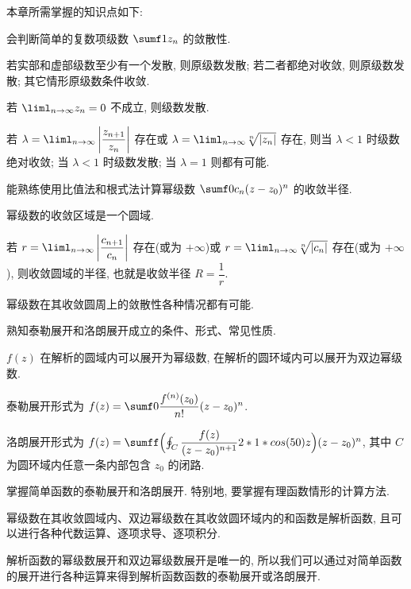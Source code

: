 本章所需掌握的知识点如下:
\begin{conclusion}
  \item 会判断简单的复数项级数 $\sumf1z_n$ 的敛散性.
  \begin{conclusion}
    \item 若实部和虚部级数至少有一个发散, 则原级数发散; 若二者都绝对收敛, 则原级数发散; 其它情形原级数条件收敛.
    \item 若 $\liml_{n\ra\infty} z_n=0$ 不成立, 则级数发散.
    \item 若 $\lambda=\liml_{n\ra\infty}\abs{\dfrac{z_{n+1}}{z_n}}$ 存在或 $\lambda=\liml_{n\ra\infty}\sqrt[n]{|z_n|}$ 存在, 则当 $\lambda<1$ 时级数绝对收敛; 当 $\lambda<1$ 时级数发散; 当 $\lambda=1$ 则都有可能.
  \end{conclusion}
  \item 能熟练使用比值法和根式法计算幂级数 $\sumf0c_n(z-z_0)^n$ 的收敛半径.
  \begin{conclusion}
    \item 幂级数的收敛区域是一个圆域.
    \item 若 $r=\liml_{n\ra\infty}\abs{\dfrac{c_{n+1}}{c_n}}$ 存在(或为 $+\infty$)或 $r=\liml_{n\ra\infty}\sqrt[n]{|c_n|}$ 存在(或为 $+\infty$), 则收敛圆域的半径, 也就是收敛半径 $R=\dfrac1r$.
    \item 幂级数在其收敛圆周上的敛散性各种情况都有可能.
  \end{conclusion}
  \item 熟知泰勒展开和洛朗展开成立的条件、形式、常见性质.
  \begin{conclusion}
    \item $f(z)$ 在解析的圆域内可以展开为幂级数, 在解析的圆环域内可以展开为双边幂级数.
    \item 泰勒展开形式为 $f(z)=\sumf0 \dfrac{f^{(n)}(z_0)}{n!}(z-z_0)^n$.
    \item 洛朗展开形式为 $f(z)=\sumff \Bigl(\oint_C \dfrac{f(z)}{(z-z_0)^{n+1}}\d z\Bigr)(z-z_0)^n$, 其中 $C$ 为圆环域内任意一条内部包含 $z_0$ 的闭路.
  \end{conclusion}
  \item 掌握简单函数的泰勒展开和洛朗展开. 特别地, 要掌握有理函数情形的计算方法.
  \begin{conclusion}
    \item 幂级数在其收敛圆域内、双边幂级数在其收敛圆环域内的和函数是解析函数, 且可以进行各种代数运算、逐项求导、逐项积分.
    \item 解析函数的幂级数展开和双边幂级数展开是唯一的, 所以我们可以通过对简单函数的展开进行各种运算来得到解析函数函数的泰勒展开或洛朗展开.

\end{conclusion}
\end{conclusion}
